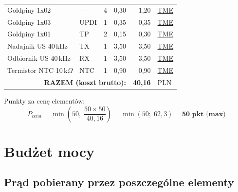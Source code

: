 \documentclass[a4paper,11pt]{article}
\begin{document}
\begin{table}[H]
\begin{tabular}{llrrrl}
        Goldpiny 1x02 & --- & 4 & 0,30 & 1,20 &
            \href{https://www.tme.eu/pl/}{TME} \\
        Goldpiny 1x03 & UPDI & 1 & 0,35 & 0,35 &
            \href{https://www.tme.eu/pl/}{TME} \\
        Goldpiny 1x01 & TP & 2 & 0,15 & 0,30 &
            \href{https://www.tme.eu/pl/}{TME} \\
        Nadajnik US 40\,kHz & TX & 1 & 3,50 & 3,50 &
            \href{https://www.tme.eu/pl/}{TME} \\
        Odbiornik US 40\,kHz & RX & 1 & 3,50 & 3,50 &
            \href{https://www.tme.eu/pl/}{TME} \\
        Termistor NTC 10\,k$\Omega$ & NTC & 1 & 0,90 & 0,90 &
            \href{https://www.tme.eu/pl/}{TME} \\
        \midrule
        \multicolumn{4}{r}{\textbf{RAZEM (koszt brutto):}} & \textbf{40,16} & PLN \\
        \bottomrule
    \end{tabular}
\end{table}

Punkty za cenę elementów:
\begin{equation}
    P_{cena} = \min\!\left(50,\; \frac{50 \times 50}{40{,}16}\right)
    = \min(50;\; 62{,}3) = \textbf{50~pkt~(max)}
    \label{eq:pkt_cena}
\end{equation}


\section{Budżet mocy}
\label{sec:moc}

\subsection{Prąd pobierany przez poszczególne elementy}
\end{document}

